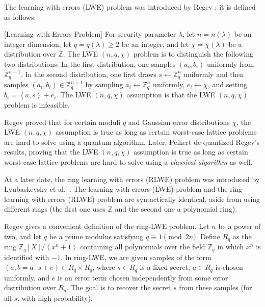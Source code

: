 The learning with errors (LWE) problem was introduced by Regev \cite{Regev:2005:LLE:1060590.1060603}; it is defined as follows:

\theoremstyle{definition}
\begin{definition}
{[Learning with Errors Problem]}
For security parameter $\lambda$, let $n = n(\lambda)$ be an integer dimension, let $q=q(\lambda) \geq 2$ be an integer, and let $\chi = \chi(\lambda)$ be a distribution over $\mathbb{Z}$. The LWE $(n, q, \chi)$ problem is to distinguish the following two distributions: In the first distribution, one samples $(a_{i},b_{i})$ uniformly from $\mathbb{Z}_{q}^{n+1}$. In the second distribution, one first draws $s \leftarrow \mathbb{Z}_{q}^{n}$ uniformly and then samples $(a_{i}, b_{i}) \in \mathbb{Z}_{q}^{n+1}$ by sampling $a_{i} \leftarrow \mathbb{Z}_{q}^{n}$ uniformly, $e_{i} \leftarrow \chi$, and setting $b_{i} = \left \langle a,s  \right \rangle + e_{i}$. The LWE $(n, q, \chi)$ assumption is that the LWE $(n, q, \chi)$ problem is infeasible.
\end{definition}

Regev proved that for certain moduli $q$ and Gaussian error distributions $\chi$, the LWE $(n, q, \chi)$ assumption is true as long as certain worst-case lattice problems are hard to solve using a quantum algorithm. Later, Peikert \cite{Peikert:2009:PCW:1536414.1536461} de-quantized Regev's results, proving that the LWE $(n, q, \chi)$ assumption is true as long as certain worst-case lattice problems are hard to solve using a \emph{classical algorithm} as well.

At a later date, the ring learning with errors (RLWE) problem was introduced by Lyubaskevsky et al.\ \cite{rlwe2010}. The learning with errors (LWE) problem and the ring learning with errors (RLWE) problem are syntactically identical, aside from using different rings (the first one uses $\mathbb{Z}$ and the second one a polynomial ring). 

Regev \cite{regevlearning} gives a convenient definition of the ring-LWE problem. Let $n$ be a power of two, and let $q$ be a prime modulus satisfying $q \equiv 1 \pmod{2n} $. Define $R_{q}$ as the ring $\mathbb{Z}_{q}[X] / \left \langle x^{n} + 1 \right \rangle$ containing all polynomials over the field $\mathbb{Z}_{q}$ in which $x^{n}$ is identified with $-1$. In ring-LWE, we are given samples of the form $(a, b = a \cdot s + e) \in R_{q} \times R_{q}$, where $s \in R_{q}$ is a fixed secret, $a \in R_{q}$ is chosen uniformly, and $e$ is an error term chosen independently from some error distribution over $R_{q}$. The goal is to recover the secret $s$ from these samples (for all $s$, with high probability).


